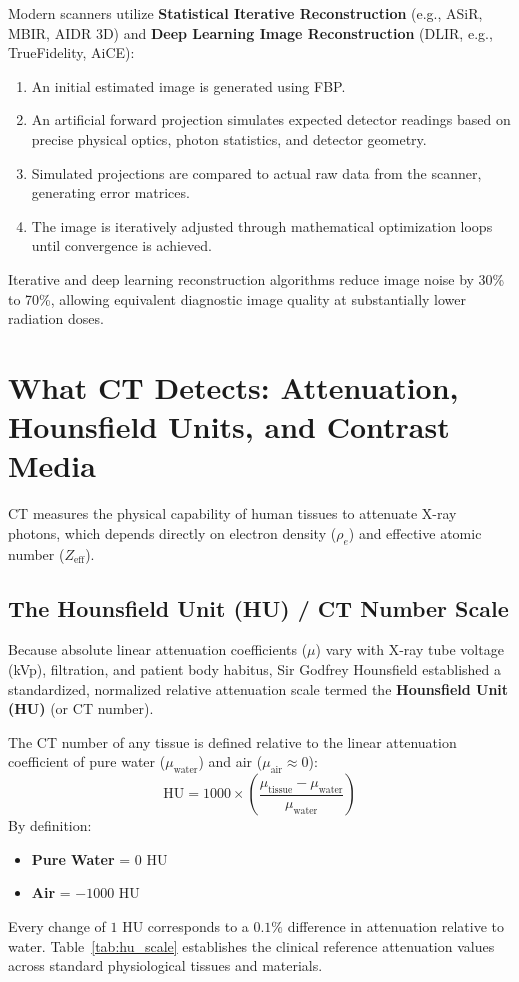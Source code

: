 \documentclass[11pt,a4paper]{article}
\begin{document}
Modern scanners utilize \textbf{Statistical Iterative Reconstruction} (e.g., ASiR, MBIR, AIDR 3D) and \textbf{Deep Learning Image Reconstruction} (DLIR, e.g., TrueFidelity, AiCE):
\begin{enumerate}
    \item An initial estimated image is generated using FBP.
    \item An artificial forward projection simulates expected detector readings based on precise physical optics, photon statistics, and detector geometry.
    \item Simulated projections are compared to actual raw data from the scanner, generating error matrices.
    \item The image is iteratively adjusted through mathematical optimization loops until convergence is achieved.
\end{enumerate}
Iterative and deep learning reconstruction algorithms reduce image noise by 30\% to 70\%, allowing equivalent diagnostic image quality at substantially lower radiation doses.

\section{What CT Detects: Attenuation, Hounsfield Units, and Contrast Media}

CT measures the physical capability of human tissues to attenuate X-ray photons, which depends directly on electron density ($\rho_e$) and effective atomic number ($Z_{\text{eff}}$).

\subsection{The Hounsfield Unit (HU) / CT Number Scale}
Because absolute linear attenuation coefficients ($\mu$) vary with X-ray tube voltage (kVp), filtration, and patient body habitus, Sir Godfrey Hounsfield established a standardized, normalized relative attenuation scale termed the \textbf{Hounsfield Unit (HU)} (or CT number).

The CT number of any tissue is defined relative to the linear attenuation coefficient of pure water ($\mu_{\text{water}}$) and air ($\mu_{\text{air}} \approx 0$):
\begin{equation}
    \text{HU} = 1000 \times \left(\frac{\mu_{\text{tissue}} - \mu_{\text{water}}}{\mu_{\text{water}}}\right)
\end{equation}
By definition:
\begin{itemize}
    \item \textbf{Pure Water} = $0\text{ HU}$
    \item \textbf{Air} = $-1000\text{ HU}$
\end{itemize}
Every change of $1\text{ HU}$ corresponds to a $0.1\%$ difference in attenuation relative to water. Table~\ref{tab:hu_scale} establishes the clinical reference attenuation values across standard physiological tissues and materials.
\end{document}
